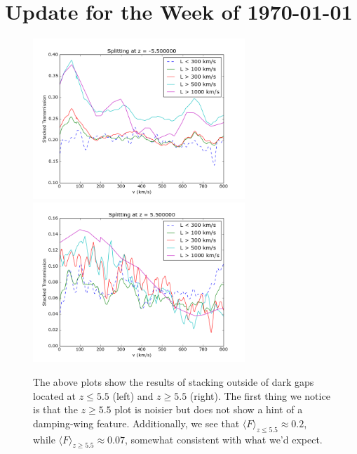 \documentclass[11pt]{article}
\begin{document}
\section*{Update for the Week of \today}

\begin{figure}[h]
  \centering
  \includegraphics[width=8cm]{Stack_Zlessthan5p5.png}
  \includegraphics[width=8cm]{Stack_Zgreaterthan5p5.png}
  \caption{The above plots show the results of stacking outside of dark gaps located at $z \leq 5.5$ (left) and $z \geq 5.5$ (right). The first thing we notice is that the $z \geq 5.5$ plot is noisier but does not show a hint of a damping-wing feature. Additionally, we see that $\langle F \rangle_{z\leq 5.5} \approx 0.2$, while $\langle F \rangle_{z\geq 5.5} \approx 0.07$, somewhat consistent with what we'd expect.}
  \label{fig:z5p5}
\end{figure}
\end{document}
